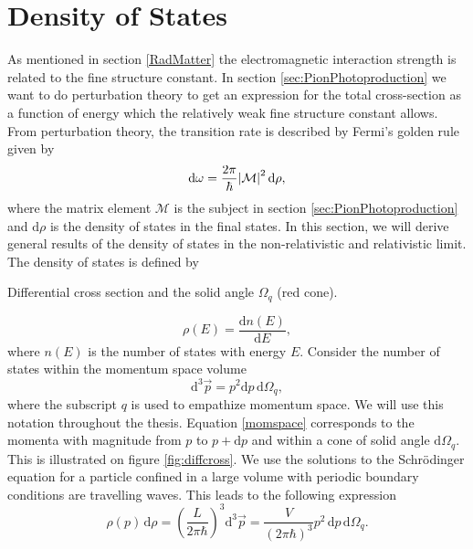 \section{Density of States}\label{sec:densityofstates}
As mentioned in section \ref{RadMatter} the electromagnetic interaction strength is related to the fine structure constant. In section \ref{sec:PionPhotoproduction} we want to do perturbation theory to get an expression for the total cross-section as a function of energy which the relatively weak fine structure constant allows. From perturbation theory, the transition rate is described by Fermi's golden rule given by
\begin{equation} \label{FermiGolden}
	\text{d}\omega = \frac{2\pi}{\hbar}\abs{\mathcal{M}}^2 \text{d}\rho,
\end{equation}
where the matrix element $\mathcal{M}$ is the subject in section \ref{sec:PionPhotoproduction} and $\text{d}\rho$ is the density of states in the final states. In this section, we will derive general results of the density of states in the non-relativistic and relativistic limit. The density of states is defined by
\begin{marginfigure}
	\centering
	
	\caption{Differential cross section and the solid angle $\Omega_q$ (red cone).}
	\label{fig:diffcross}
\end{marginfigure}
\begin{equation} \label{DensityOfStates}
	\rho(E) = \frac{\text{d}n(E)}{\text{d}E},
\end{equation}
where $n(E)$ is the number of states with energy $E$. Consider the number of states within the momentum space volume
\begin{equation} \label{momspace}
	\text{d}^3\vec{p} = p^2 \text{d}p \, \text{d}\Omega_q,
\end{equation}
where the subscript $q$ is used to empathize momentum space. We will use this notation throughout the thesis. Equation \eqref{momspace} corresponds to the momenta with magnitude from $p$ to $p+\text{d}p$ and within a cone of solid angle $\text{d}\Omega_q$. This is illustrated on figure \ref{fig:diffcross}. We use the solutions to the Schrödinger equation for a particle confined in a large volume with periodic boundary conditions are travelling waves. This leads to the following expression
\begin{equation} \label{densityrho}
	\rho(p) \, \text{d}\rho = \left( \frac{L}{2\pi\hbar}\right)^3 \text{d}^3 \vec{p} = \frac{V}{(2\pi\hbar)^3} p^2 \, \text{d}p \, \text{d}\Omega_q.
\end{equation}
